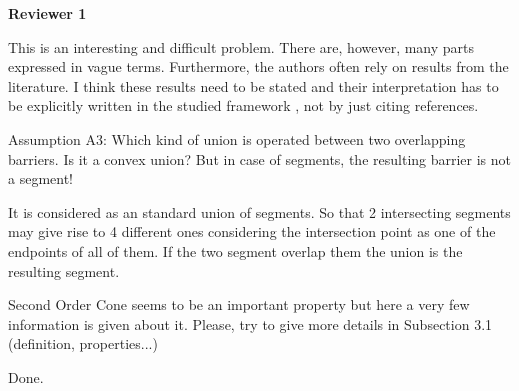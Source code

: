 \documentclass{article}
\newenvironment{reviewer}{\setcounter{pointcounter}{1}}{}
\newcommand{\point}{\text{{\selectfont \thepointcounter} \stepcounter{pointcounter}}}
\begin{document}
	\begin{reviewer}
		
		\begin{tcolorbox}[breakable,enhanced,coltitle=black,colback=red!75!black,colframe=red!75!black,borderline={1pt}{0pt}{black},boxrule=0pt]
			\textbf{Reviewer 1}
		\end{tcolorbox}
		
		\begin{itshape}
			This is an interesting and difficult problem. There are, however, many parts
			expressed in vague terms. Furthermore, the authors often rely on results from the
			literature. I think these results need to be stated and their interpretation has to be
			explicitly written in the studied framework , not by just citing references.
		\end{itshape}
		
		\begin{tcolorbox}[breakable,enhanced,coltitle=black,colback=red!5!white,colframe=red!75!black,title=\textbf{Answer R1.\point},borderline={1pt}{0pt}{black},boxrule=0pt]

		\end{tcolorbox}
		
		\begin{itshape}
			Assumption A3: Which kind of union is operated between two overlapping barriers. Is it a convex union? But in case of segments, the resulting barrier is not a segment!
		\end{itshape}
		
		\begin{tcolorbox}[breakable,enhanced,coltitle=black,colback=red!5!white,colframe=red!75!black,title=\textbf{Answer R1.\point},borderline={1pt}{0pt}{black},boxrule=0pt]
		It is considered as an standard union of segments. So that 2 intersecting segments may give rise to 4 different ones considering the intersection point as one of the  endpoints of all of them. If the two segment overlap them the union is the resulting segment.
		\end{tcolorbox}
		
		\begin{itshape}
			Second Order Cone seems to be an important property but here a very few information is given about it. Please, try to give more details in Subsection 3.1 (definition, properties...)
		\end{itshape}
		
		\begin{tcolorbox}[breakable,enhanced,coltitle=black,colback=red!5!white,colframe=red!75!black,title=\textbf{Answer R1.\point},borderline={1pt}{0pt}{black},boxrule=0pt]
			Done.
		\end{tcolorbox}
		

\end{reviewer}
\end{document}
